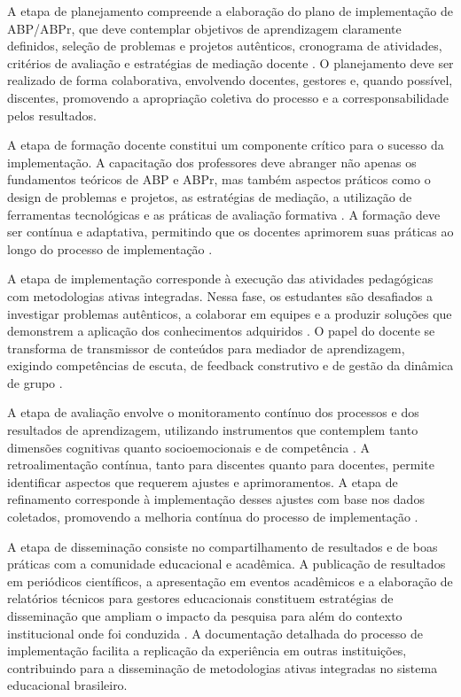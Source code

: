 A etapa de planejamento compreende a elaboração do plano de implementação de ABP/ABPr, que deve contemplar objetivos de aprendizagem claramente definidos, seleção de problemas e projetos autênticos, cronograma de atividades, critérios de avaliação e estratégias de mediação docente \cite{COSTA2020}. O planejamento deve ser realizado de forma colaborativa, envolvendo docentes, gestores e, quando possível, discentes, promovendo a apropriação coletiva do processo e a corresponsabilidade pelos resultados.

A etapa de formação docente constitui um componente crítico para o sucesso da implementação. A capacitação dos professores deve abranger não apenas os fundamentos teóricos de ABP e ABPr, mas também aspectos práticos como o design de problemas e projetos, as estratégias de mediação, a utilização de ferramentas tecnológicas e as práticas de avaliação formativa \cite{SOARES2021}. A formação deve ser contínua e adaptativa, permitindo que os docentes aprimorem suas práticas ao longo do processo de implementação \cite{RIOS2026}.

A etapa de implementação corresponde à execução das atividades pedagógicas com metodologias ativas integradas. Nessa fase, os estudantes são desafiados a investigar problemas autênticos, a colaborar em equipes e a produzir soluções que demonstrem a aplicação dos conhecimentos adquiridos \cite{BARRON1998}. O papel do docente se transforma de transmissor de conteúdos para mediador de aprendizagem, exigindo competências de escuta, de feedback construtivo e de gestão da dinâmica de grupo \cite{MORAN2018}.

A etapa de avaliação envolve o monitoramento contínuo dos processos e dos resultados de aprendizagem, utilizando instrumentos que contemplem tanto dimensões cognitivas quanto socioemocionais e de competência \cite{BLACK1998}. A retroalimentação contínua, tanto para discentes quanto para docentes, permite identificar aspectos que requerem ajustes e aprimoramentos. A etapa de refinamento corresponde à implementação desses ajustes com base nos dados coletados, promovendo a melhoria contínua do processo de implementação \cite{CRESWELL2018}.

A etapa de disseminação consiste no compartilhamento de resultados e de boas práticas com a comunidade educacional e acadêmica. A publicação de resultados em periódicos científicos, a apresentação em eventos acadêmicos e a elaboração de relatórios técnicos para gestores educacionais constituem estratégias de disseminação que ampliam o impacto da pesquisa para além do contexto institucional onde foi conduzida \cite{SANTOS2024}. A documentação detalhada do processo de implementação facilita a replicação da experiência em outras instituições, contribuindo para a disseminação de metodologias ativas integradas no sistema educacional brasileiro.

